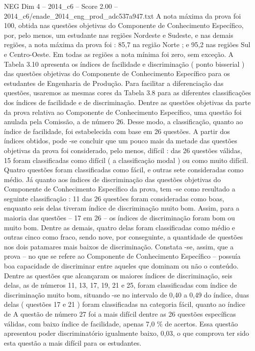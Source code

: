 \begin{textsample}{NEG Dim 4 – 2014\_c6 – Score 2.00 – 2014\_c6/enade\_2014\_eng\_prod\_adc537a947.txt}
A nota máxima da prova foi 100, obtida nas questões objetivas do Componente de Conhecimento Específico, por, pelo menos, um estudante nas regiões Nordeste e Sudeste, e nas demais regiões, a nota máxima da prova foi : 85,7 na região Norte ; e 95,2 nas regiões Sul e Centro-Oeste.
Em todas as regiões a nota mínima foi zero, sem exceção.
A Tabela 3.10 apresenta os índices de facilidade e discriminação ( ponto bisserial ) das questões objetivas do Componente de Conhecimento Específico para os estudantes de Engenharia de Produção.
Para facilitar a diferenciação das questões, usaremos as mesmas cores da Tabela 3.8 para as diferentes classificações dos índices de facilidade e de discriminação.
Dentre as questões objetivas da parte da prova relativa ao Componente de Conhecimento Específico, uma questão foi anulada pela Comissão, a de número 26.
Desse modo, a classificação, quanto ao índice de facilidade, foi estabelecida com base em 26 questões.
A partir dos índices obtidos, pode -se concluir que um pouco mais da metade das questões objetivas da prova foi considerado, pelo menos, difícil : das 26 questões válidas, 15 foram classificadas como difícil ( a classificação modal ) ou como muito difícil.
Quatro questões foram classificadas como fácil, e outras sete consideradas como médio.
Já quanto aos índices de discriminação das questões objetivas do Componente de Conhecimento Específico da prova, tem -se como resultado a seguinte classificação : 11 das 26 questões foram consideradas como boas, enquanto seis delas tiveram índice de discriminação muito bom.
Assim, para a maioria das questões – 17 em 26 – os índices de discriminação foram bom ou muito bom.
Dentre as demais, quatro delas foram classificadas como médio e outras cinco como fraco, sendo nove, por conseguinte, a quantidade de questões nos dois patamares mais baixos de discriminação.
Constata -se, assim, que a prova – no que se refere ao Componente de Conhecimento Específico – possuía boa capacidade de discriminar entre aqueles que dominam ou não o conteúdo.
Dentre as questões que alcançaram os maiores índices de discriminação, seis delas, as de números 11, 13, 17, 19, 21 e 25, foram classificadas com índice de discriminação muito bom, situando -se no intervalo de 0,40 a 0,49 do índice, duas delas ( questões 17 e 21 ) foram classificadas na categoria fácil, quanto ao índice de A questão de número 27 foi a mais difícil dentre as 26 questões específicas válidas, com baixo índice de facilidade, apenas 7,0 \% de acertos.
Essa questão apresentou poder discriminatório igualmente baixo, 0,03, o que comprova ter sido esta questão a mais difícil para os estudantes.

\end{textsample}
